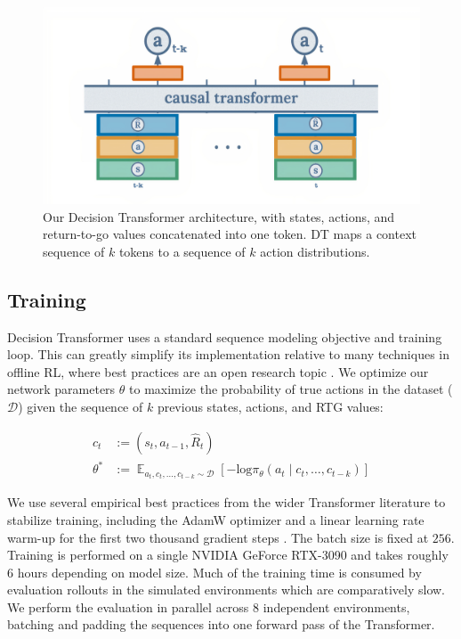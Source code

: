 
\begin{figure}[h!]
    \centering
    \includegraphics[width=.45\textwidth]{figs/arch.jpg}
    \caption{Our Decision Transformer architecture, with states, actions, and return-to-go values concatenated into one token. DT maps a context sequence of $k$ tokens to a sequence of $k$ action distributions.}
    \label{fig:arch}
\end{figure}


\subsection{Training}
Decision Transformer uses a standard sequence modeling objective and training loop. This can greatly simplify its implementation relative to many techniques in offline RL, where best practices are an open research topic \cite{kumar2021workflow}. We optimize our network parameters $\theta$ to maximize the probability of true actions in the dataset ($\mathcal{D}$) given the sequence of $k$ previous states, actions, and RTG values:

\vspace{-5mm}
\begin{align}
    c_t &:= (s_t, a_{t-1}, \hat{R}_t) \nonumber \\
    \theta^{\ast} &:= \mathop{\mathbb{E}}_{a_t, c_{t}, \dots, c_{t-k} \sim \mathcal{D}}[-\text{log}\pi_{\theta}(a_t \mid c_{t}, \dots, c_{t-k})]
    \label{eq:loss}
\end{align}

We use several empirical best practices from the wider Transformer literature to stabilize training, including the AdamW optimizer \cite{loshchilov2017decoupled} and a linear learning rate warm-up for the first two thousand gradient steps \cite{transformer}. The batch size is fixed at $256$. Training is performed on a single NVIDIA GeForce RTX-3090 and takes roughly $6$ hours depending on model size. Much of the training time is consumed by evaluation rollouts in the simulated environments which are comparatively slow. We perform the evaluation in parallel across $8$ independent environments, batching and padding the sequences into one forward pass of the Transformer.
